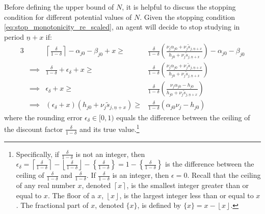 \documentclass[11 pt]{article}
\newcommand{\pr}[1]{\left( #1 \right)}
\newcommand{\ceil}[1]{\left\lceil #1 \right\rceil}
\newcommand{\floor}[1]{\left\lfloor #1 \right\rfloor}
\newcommand{\pass}{s}
\newcommand{\ddelta}{\left\lceil \frac{\delta}{1 - \delta} \right\rceil}
\newcommand{\cmf}[1]{\left\lceil #1 \right\rceil - \left\lfloor #1 \right\rfloor}
\newcommand*{\ks}[1][t]{\tilde{\pass}_{j #1}}
\begin{document}
\noindent
Before defining the upper bound of $N$, it is helpful to discuss the stopping condition for different potential values of $N$.
Given the stopping condition \eqref{eq:stop_monotonicity_re_scaled}, an agent will decide to stop studying in period $\underline{n} + x$ if: 
\begin{alignat}{3}
    &&
    \ddelta - \alpha_{j0} - \beta_{j0} + x
    \geq&
    \frac{\delta}{1-\delta}
    \pr{\frac{\nu_j \alpha_{j0} + \nu_j \ks[,\underline{n} + x]}{h_{j0} + \nu_j \ks[,\underline{n} + x]}}
    -\alpha_{j0} - \beta_{j0}
    \nonumber \\
    &\implies &
    \frac{\delta}{1 - \delta}
    + \epsilon_\delta
    + x
    \geq&
    \frac{\delta}{1 - \delta}
    \pr{
       \frac{\nu_j \alpha_{j0} + \nu_j \ks[,\underline{n} + x]}{h_{j0} + \nu_j \ks[,\underline{n} + x]}
    }
    \nonumber
    \\
    &\implies &
    \epsilon_\delta 
    + x
    \geq&
    \frac{\delta}{1 - \delta}
    \pr{
        \frac{\nu_j \alpha_{j0} - h_{j0}}{h_{j0} + \nu_j \ks[,\underline{n} + x]}
    }
    \nonumber
    \\
    &\implies &
    \pr{
        \epsilon_\delta  + x
    }
    \pr{h_{j0} + \nu_j \ks[,\underline{n} + x]}
    \geq&
    \frac{\delta}{1 - \delta}
    \pr{\alpha_{j0} \nu_j - h_{j0}}
    \label{eq:stop_with_error}
\end{alignat}
where the rounding error $\epsilon_\delta \in [0, 1)$ equals the difference between the ceiling of the discount factor $\frac{\delta}{1 - \delta}$ and its true value.\footnote{
    Specifically, if $\frac{\delta}{1 - \delta}$ is not an integer, then $\epsilon_\delta = \cmf{\frac{\delta}{1 - \delta}} - \left\{ \frac{\delta}{1 - \delta} \right\} = 1 - \left\{ \frac{\delta}{1 - \delta} \right\}$ is the difference between the ceiling of $\frac{\delta}{1 - \delta}$ and $\frac{\delta}{1 - \delta}$. 
    If $\frac{\delta}{1 - \delta}$ is an integer, then $\epsilon = 0$.
    Recall that the ceiling of any real number $x$, denoted $\ceil{x}$, is the smallest integer greater than or equal to $x$.
    The floor of a $x$, $\floor{x}$, is the largest integer less than or equal to $x$. 
    The fractional part of $x$, denoted $\{x\}$, is defined by $\{x\} = x - \floor{x}$.
}
\end{document}
